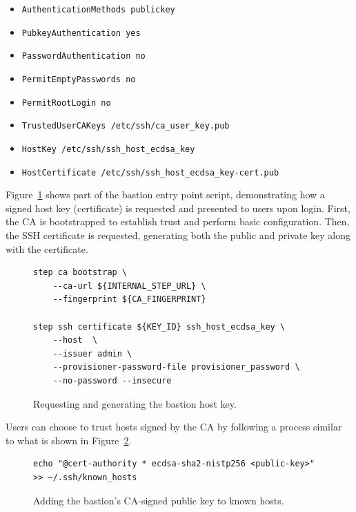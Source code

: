 \begin{multicols}{2} 
    \begin{itemize}
        \item \texttt{AuthenticationMethods publickey}
        \item \texttt{PubkeyAuthentication yes}
        \item \texttt{PasswordAuthentication no}
        \item \texttt{PermitEmptyPasswords no}
        \item \texttt{PermitRootLogin no}
        \item \texttt{TrustedUserCAKeys /etc/ssh/\allowbreak ca\_user\_key.pub}
        \item \texttt{HostKey /etc/ssh/ssh\_host\allowbreak\_ecdsa\_key}
        \item \texttt{HostCertificate /etc/ssh/\allowbreak  ssh\_host\_ecdsa\_key-cert.pub}
    \end{itemize}
\end{multicols}

Figure~\ref{fig:bastion_host_key} shows part of the bastion entry point script, demonstrating how a signed host key (certificate) is requested and presented to users upon login. First, the CA is bootstrapped to establish trust and perform basic configuration. Then, the SSH certificate is requested, generating both the public and private key along with the certificate.

\begin{figure}[h]
    \centering
\begin{verbatim}
step ca bootstrap \
    --ca-url ${INTERNAL_STEP_URL} \
    --fingerprint ${CA_FINGERPRINT}

step ssh certificate ${KEY_ID} ssh_host_ecdsa_key \
    --host  \
    --issuer admin \
    --provisioner-password-file provisioner_password \
    --no-password --insecure
\end{verbatim}
    \caption{Requesting and generating the bastion host key.}
    \label{fig:bastion_host_key}
\end{figure}

Users can choose to trust hosts signed by the CA by following a process similar to what is shown in Figure~\ref{fig:bastion_known_hosts}.

\begin{figure}[h]
    \centering
\begin{verbatim}
echo "@cert-authority * ecdsa-sha2-nistp256 <public-key>" >> ~/.ssh/known_hosts
\end{verbatim}
    \caption{Adding the bastion's CA-signed public key to known hosts.}
    \label{fig:bastion_known_hosts}
\end{figure}

